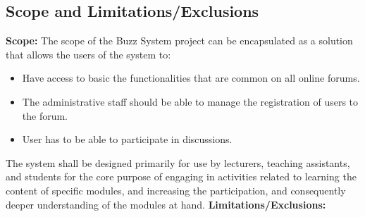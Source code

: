\documentclass[11pt]{article}
\begin{document}
\subsection{Scope and Limitations/Exclusions}
\textbf{Scope: } \newline
The scope of the Buzz System project can be encapsulated as a solution that allows the users of the system to:
\begin{itemize}
\item Have access to basic the functionalities that are common on all online forums.
\item The administrative staff should be able to manage the registration of users to the forum.
\item User has to be able to participate in discussions. 
\end{itemize}
The system shall be designed primarily for use by lecturers, teaching
assistants, and students for the core purpose of engaging in activities related to learning the content of specific modules, and increasing the participation, and consequently deeper understanding of the modules at hand. \newline
\textbf{Limitations/Exclusions: } \newline
\end{document}
